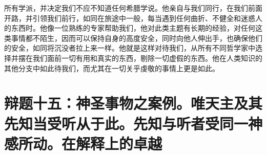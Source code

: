 所有学派，并决定我们不应不知道任何希腊学说。他亲自与我们同行，在我们前面开路，并引领我们前行，如同在旅途中一般，每当遇到任何曲折、不健全和迷惑人的东西时。他像一位熟练的专家帮助我们，他对此类主题有长期的经验，对任何这类事情都不陌生，因而可以保持自身的高度安全，同时向他人伸出手，也确保他们的安全，如同将沉没者拉上来一样。他就是这样对待我们，从所有不同哲学家中选择并摆在我们面前一切有用和真实的东西，剔除一切虚假的东西。他在人类知识的其他分支中如此待我们，而尤其在一切关乎虔敬的事情上更是如此。\par


\section{辩题十五：神圣事物之案例。唯天主及其先知当受听从于此。先知与听者受同一神感所动。在解释上的卓越}

